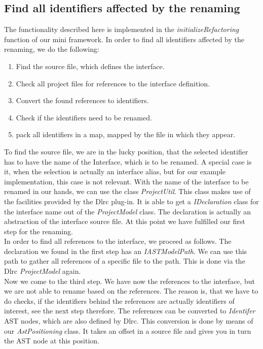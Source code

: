 \documentclass[a4paper,10pt]{report}
\begin{document}
\subsection{Find all identifiers affected by the renaming}
The functionality described here is implemented in the {\it initializeRefactoring} function of our mini framework.
In order to find all identifiers affected by the renaming, we do the following:
   \begin{enumerate}
     \item Find the source file, which defines the interface.
     \item Check all project files for references to the interface definition.
     \item Convert the found references to identifiers.
     \item Check if the identifiers need to be renamed.
     \item pack all identifiers in a map, mapped by the file in which they appear.
   \end{enumerate}
To find the source file, we are in the lucky position, that the selected identifier has to have the name of the Interface, which is to be renamed. 
A special case is it, when the selection is actually an interface alias, but for our example implementation, this case is not relevant. 
With the name of the interface to be renamed in our hands, we can use the class {\it ProjectUtil}.
This class makes use of the facilities provided by the Dlrc plug-in.
It is able to get a {\it IDeclaration} class for the interface name out of the {\it ProjectModel} class.
The declaration is actually an abstraction of the interface source file. 
At this point we have fulfilled our first step for the renaming.\\
In order to find all references to the interface, we proceed as follows. The declaration we found in the first step has an {\it IASTModelPath}. 
We can use this path to gather all references of a specific file to the path. This is done via the Dlrc {\it ProjectModel} again.\\
Now we come to the third step. We have now the references to the interface, but we are not able to rename based on the references.
The reason is, that we have to do checks, if the identifiers behind the references are actually identifiers of interest, see the next step therefore.
The references can be converted to {\it Identifer} AST nodes, which are also defined by Dlrc.
This conversion is done by means of our {\it AstPositioning} class.
It takes an offset in a source file and gives you in turn the AST node at this position. 
\end{document}
